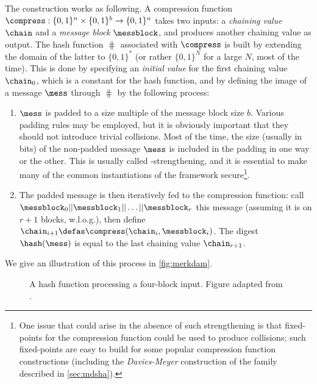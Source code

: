 The construction works as following. A compression function $\compress : \{0,1\}^n \times \{0,1\}^b \rightarrow \{0,1\}^n$
takes two inputs: a \emph{chaining value} $\chain$ and a \emph{message block} $\messblock$, and produces another chaining value as output.
The hash function $\hash$ associated with $\compress$ is built by extending the domain of the latter to $\{0,1\}^*$ (or rather $\{0,1\}^N$ for a large $N$, most of the time).
This is done by specifying an \emph{initial value} \iv for the first chaining value $\chain_0$, which is a constant for the hash function, and by defining the image
of a message $\mess$ through $\hash$ by the following process:
\begin{enumerate}
\item $\mess$ is padded to a size multiple of the message block size $b$. Various padding rules may be employed, but it is obviously important that they should not
introduce trivial collisions. Most of the time, the size (usually in bits) of the non-padded message $\mess$ is included in the padding in one way or the other.
This is usually called \merkdam-strengthening, and it is essential to make many of the common instantiations of the framework secure\footnote{One issue that
could arise in the absence of such strengthening is that fixed-points for the compression function could be used to produce collisions; such fixed-points
are easy to build for some popular compression function constructions (including the \emph{Davies-Meyer} construction
of the \mdsha family described in \autoref{sec:mdsha}).}.
\item The padded message is then iteratively fed to the compression function: call $\messblock_0||\messblock_1||\linebreak\ldots||\messblock_r$ this message (assuming
it is on $r+1$ blocks, w.l.o.g.), then define $\chain_{i+1} \defas \compress(\chain_i, \messblock_i)$. The digest $\hash(\mess)$ is equal to the last
chaining value $\chain_{r+1}$.
\end{enumerate}
We give an illustration of this process in \autoref{fig:merkdam}.

\begin{figure}[!htb]
\begin{center}

\caption[A \merkdam hash function processing a four-block input.]{A \merkdam hash function processing a four-block input. Figure adapted from \cite{TiKZ:Cryptographers}.}
\end{center}
\end{figure} 

